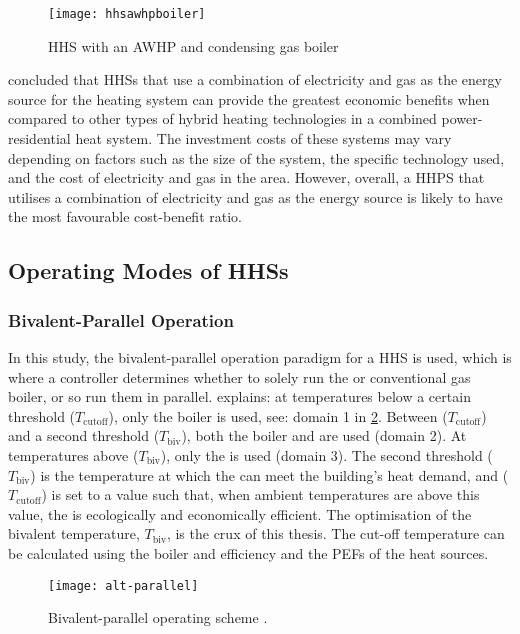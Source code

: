 \begin{figure}[htb]
    \centering
    \texttt{[image: hhsawhpboiler]}
    \caption{\acs{HHS} with an \acs{AWHP} and condensing gas boiler \cite{dongellini_influence_2021}}
    \label{fig:hhsawhpboilerdiagram}
\end{figure}

\citeauthor{heinen_electricity_2016} \cite{heinen_electricity_2016} concluded that \acp{HHS} that use a combination of electricity and gas as the energy source for the heating system can provide the greatest economic benefits when compared to other types of hybrid heating technologies in a combined power-residential heat system. The investment costs of these systems may vary depending on factors such as the size of the system, the specific technology used, and the cost of electricity and gas in the area. However, overall, a \ac{HHPS} that utilises a combination of electricity and gas as the energy source is likely to have the most favourable cost-benefit ratio.


\subsection{Operating Modes of \acp{HHS}}

\subsubsection{Bivalent-Parallel Operation}
\label{subsubsec:biv-parallelop}
In this study, the bivalent-parallel operation paradigm for a \ac{HHS} is used, which is where a controller determines whether to solely run the \HP or conventional gas boiler, or so run them in parallel. \citeauthor{buday_2014} \cite{buday_2014} explains: at temperatures below a certain threshold ($T_\text{cutoff}$), only the boiler is used, see: domain 1 in \cref{fig:alt-parallel}. Between ($T_\text{cutoff}$) and a second threshold ($T_\text{biv}$), both the boiler and \HP are used (domain 2). At temperatures above ($T_\text{biv}$), only the \HP is used (domain 3). The second threshold ($T_\text{biv}$) is the temperature at which the \HP can meet the building's heat demand, and ($T_\text{cutoff}$) is set to a value such that, when ambient temperatures are above this value, the \HP is ecologically and economically efficient. The optimisation of the bivalent temperature, $T_\text{biv}$, is the crux of this thesis. The cut-off temperature can be calculated using the boiler and \HP efficiency and the \acp{PEF} of the heat sources. 
\begin{figure}[htb]
    \centering
    \texttt{[image: alt-parallel]}
    \caption{Bivalent-parallel operating scheme \cite{klein_numerical_2014}.}
    \label{fig:alt-parallel}
\end{figure}

